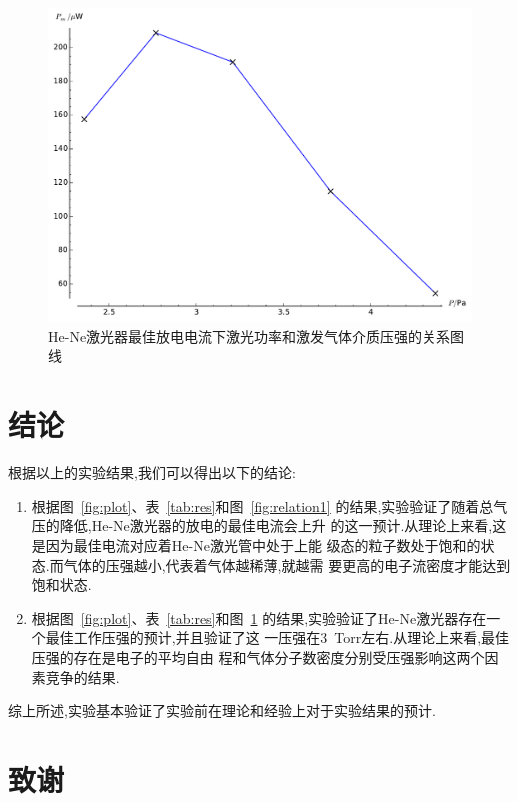 \documentclass[aps,pre,12pt,preprint,onecolumn,showpacs,showkeys]{revtex4-1}
\begin{document}
\begin{figure}[htbp]
  \centering
\includegraphics[width=\textwidth]{plot2.pdf}
\caption{\label{fig:relation2}%
He-Ne激光器最佳放电电流下激光功率和激发气体介质压强的关系图线}
\end{figure}


\section{结论}
 
根据以上的实验结果,我们可以得出以下的结论:

\begin{enumerate}
\item 根据图~\ref{fig:plot}、表~\ref{tab:res}和图~\ref{fig:relation1}
  的结果,实验验证了随着总气压的降低,He-Ne激光器的放电的最佳电流会上升
  的这一预计.从理论上来看,这是因为最佳电流对应着He-Ne激光管中处于上能
  级态的粒子数处于饱和的状态.而气体的压强越小,代表着气体越稀薄,就越需
  要更高的电子流密度才能达到饱和状态.
\item 根据图~\ref{fig:plot}、表~\ref{tab:res}和图~\ref{fig:relation2}
  的结果,实验验证了He-Ne激光器存在一个最佳工作压强的预计,并且验证了这
  一压强在\SI{3}{Torr}左右.从理论上来看,最佳压强的存在是电子的平均自由
  程和气体分子数密度分别受压强影响这两个因素竞争的结果.
\end{enumerate}
 
综上所述,实验基本验证了实验前在理论和经验上对于实验结果的预计.

\section{致谢}
\end{document}
